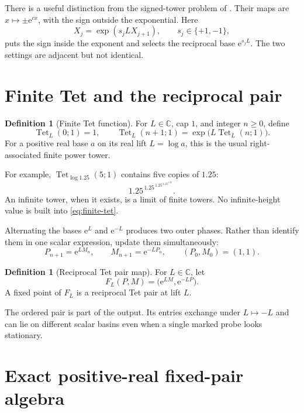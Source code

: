 \documentclass[11pt]{article}
\theoremstyle{definition}
\newtheorem{definition}[theorem]{Definition}
\theoremstyle{remark}
\newcommand{\C}{\mathbb C}
\newcommand{\Tet}{\operatorname{Tet}}
\newcommand{\e}{\mathrm e}
\begin{document}
There is a useful distinction from the signed-tower problem of \citet{MazetHalberstadt2025}.  Their maps are $x\mapsto \pm \e^{cx}$, with the sign outside the exponential.  Here
\[
  X_j=\exp(s_jL X_{j+1}),\qquad s_j\in\{+1,-1\},
\]
puts the sign inside the exponent and selects the reciprocal base $\e^{s_jL}$.  The two settings are adjacent but not identical.

\section{Finite Tet and the reciprocal pair}

\begin{definition}[Finite Tet function]
For $L\in\C$, cap $1$, and integer $n\ge0$, define
\begin{equation}
  \Tet_L(0;1)=1,
  \qquad
  \Tet_L(n+1;1)=\exp\!\bigl(L\Tet_L(n;1)\bigr).
  \label{eq:finite-tet}
\end{equation}
For a positive real base $a$ on its real lift $L=\log a$, this is the usual right-associated finite power tower.
\end{definition}

For example, $\Tet_{\log 1.25}(5;1)$ contains five copies of $1.25$:
\[
  1.25^{\,1.25^{\,1.25^{\,1.25^{\,1.25}}}}.
\]
An infinite tower, when it exists, is a limit of finite towers.  No infinite-height value is built into \cref{eq:finite-tet}.

Alternating the bases $\e^L$ and $\e^{-L}$ produces two outer phases.  Rather than identify them in one scalar expression, update them simultaneously:
\begin{equation}
  P_{n+1}=\e^{LM_n},\qquad
  M_{n+1}=\e^{-LP_n},
  \qquad (P_0,M_0)=(1,1).
  \label{eq:pair-recurrence}
\end{equation}

\begin{definition}[Reciprocal Tet pair map]
For $L\in\C$, let
\begin{equation}
  F_L(P,M)=\bigl(\e^{LM},\e^{-LP}\bigr).
  \label{eq:pair-map}
\end{equation}
A fixed point of $F_L$ is a reciprocal Tet pair at lift $L$.
\end{definition}

The ordered pair is part of the output.  Its entries exchange under $L\mapsto-L$ and can lie on different scalar basins even when a single marked probe looks stationary.

\section{Exact positive-real fixed-pair algebra}
\end{document}
